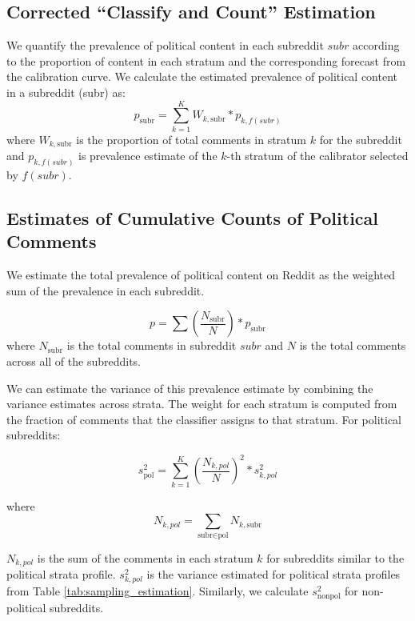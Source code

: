 \documentclass[letterpaper]{article} %
\begin{document}
\subsection{Corrected ``Classify and Count'' Estimation}\label{estimate}

We quantify the prevalence of political content in each subreddit $subr$ according to the proportion of content in each stratum and the corresponding forecast from the calibration curve. We calculate the estimated prevalence of political content in a subreddit (subr) as:
\begin{displaymath}
p_{\textrm{subr}}= \sum_{k=1}^{K}W_{k,\textrm{subr}} * p_{k,f(subr)}
\end{displaymath}
where $W_{k,\textrm{subr}}$ is the proportion of total comments in stratum $k$ for the subreddit and $p_{k,f(subr)}$ is prevalence estimate of the $k$-th stratum of the calibrator selected by $f(subr)$.

\subsection{Estimates of Cumulative Counts of Political Comments}\label{cumulative}

We estimate the total prevalence of political content on Reddit as the weighted sum of the prevalence in each subreddit.

\begin{displaymath}
p = \sum \left(\frac{N_{\textrm{subr}}}{N}\right) * p_{\textrm{subr}}
\end{displaymath}
where $N_{\textrm{subr}}$ is the total comments in subreddit $subr$ and $N$ is the total comments across all of the subreddits.

We can estimate the variance of this prevalence estimate by combining the variance estimates across strata. The weight for each stratum is computed from the fraction of comments that the classifier assigns to that stratum. For political subreddits:



\begin{displaymath}
s^2_{\textrm{pol}} =  \sum_{k=1}^{K}{\left(\frac{N_{k,pol}}{N}\right)^2 * s^2_{k,pol}}
\end{displaymath}

where
\begin{displaymath}
N_{k,pol} = \sum_{\textrm{subr} \in \textrm{pol}}N_{k, \textrm{subr}}
\end{displaymath}

$N_{k,pol}$ is the sum of the comments in each stratum $k$ for subreddits similar to the political strata profile. $s^2_{k,pol}$ is the variance estimated for political strata profiles from Table \ref{tab:sampling_estimation}. Similarly, we calculate $s^2_{\textrm{nonpol}}$ for non-political subreddits.
\end{document}
